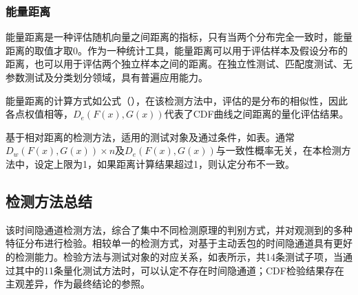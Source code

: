 \subsubsection{能量距离}
\label{chap:analyze:statistical:distance:energy}

能量距离是一种评估随机向量之间距离的指标，只有当两个分布完全一致时，能量距离的取值才取0。作为一种统计工具，能量距离可以用于评估样本及假设分布的距离，也可以用于评估两个独立样本之间的距离。在独立性测试、匹配度测试、无参数测试及分类划分领域，具有普遍应用能力。


能量距离的计算方式如公式（），在该检测方法中，评估的是分布的相似性，因此各点权值相等，$D_{e}(F(x),G(x))$代表了CDF曲线之间距离的量化评估结果。


基于相对距离的检测方法，适用的测试对象及通过条件，如表。通常$D_{w}(F(x),G(x))\times n$及$D_{e}(F(x),G(x))$与一致性概率无关，在本检测方法中，设定上限为1，如果距离计算结果超过1，则认定分布不一致。

\subsection{检测方法总结}
\label{chap:analyze:statistical:sum}
该时间隐通道检测方法，综合了集中不同检测原理的判别方式，并对观测到的多种特征分布进行检验。相较单一的检测方式，对基于主动丢包的时间隐通道具有更好的检测能力。检验方法与测试对象的对应关系，如表所示，共14条测试子项，当通过其中的11条量化测试方法时，可以认定不存在时间隐通道；CDF检验结果存在主观差异，作为最终结论的参照。

